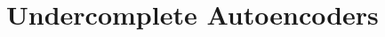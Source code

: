\documentclass[11pt,compress,t,notes=noshow, xcolor=table]{beamer}
\begin{document}
% 
% 
% 
% 

\section{Undercomplete Autoencoders}
\end{document}
